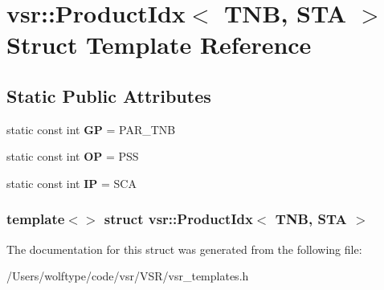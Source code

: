 \hypertarget{structvsr_1_1_product_idx_3_01_t_n_b_00_01_s_t_a_01_4}{\section{vsr\-:\-:Product\-Idx$<$ T\-N\-B, S\-T\-A $>$ Struct Template Reference}
\label{structvsr_1_1_product_idx_3_01_t_n_b_00_01_s_t_a_01_4}
}
\subsection*{Static Public Attributes}
\begin{DoxyCompactItemize}
\item 
\hypertarget{structvsr_1_1_product_idx_3_01_t_n_b_00_01_s_t_a_01_4_a998737e88a1aa5682eb48cf78ace2066}{static const int {\bfseries G\-P} = P\-A\-R\-\_\-\-T\-N\-B}\label{structvsr_1_1_product_idx_3_01_t_n_b_00_01_s_t_a_01_4_a998737e88a1aa5682eb48cf78ace2066}

\item 
\hypertarget{structvsr_1_1_product_idx_3_01_t_n_b_00_01_s_t_a_01_4_a7611df660d20b29655d248857e47d1b2}{static const int {\bfseries O\-P} = P\-S\-S}\label{structvsr_1_1_product_idx_3_01_t_n_b_00_01_s_t_a_01_4_a7611df660d20b29655d248857e47d1b2}

\item 
\hypertarget{structvsr_1_1_product_idx_3_01_t_n_b_00_01_s_t_a_01_4_a717e0be25d80aaaab6a999c383d08f2e}{static const int {\bfseries I\-P} = S\-C\-A}\label{structvsr_1_1_product_idx_3_01_t_n_b_00_01_s_t_a_01_4_a717e0be25d80aaaab6a999c383d08f2e}

\end{DoxyCompactItemize}
\subsubsection*{template$<$$>$ struct vsr\-::\-Product\-Idx$<$ T\-N\-B, S\-T\-A $>$}



The documentation for this struct was generated from the following file\-:\begin{DoxyCompactItemize}
\item 
/\-Users/wolftype/code/vsr/\-V\-S\-R/vsr\-\_\-templates.\-h\end{DoxyCompactItemize}

